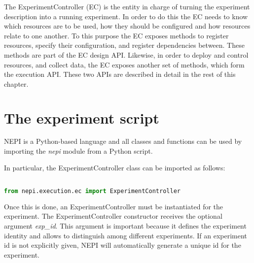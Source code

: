 %
%
%
%
%
%


The ExperimentController (EC) is the entity in charge of turning the 
experiment description into a running experiment. 
In order to do this the EC needs to know which resources are to be 
used, how they should be configured and how resources relate to one another.
To this purpose the EC exposes methods to register resources, specify their 
configuration, and register dependencies between. These methods are part of
the EC design API.
Likewise, in order to deploy and control resources, and collect data, 
the EC exposes another set of methods, which form the execution API. 
These two APIs are described in detail in the rest of this chapter.


\section{The experiment script}

NEPI is a Python-based language and all classes and functions can
be used by importing the \emph{nepi} module from a Python script.

In particular, the ExperimentController class can be imported as follows:

\begin{lstlisting}[language=Python]

from nepi.execution.ec import ExperimentController

\end{lstlisting}

Once this is done, an ExperimentController must be instantiated for
the experiment. The ExperimentController constructor receives
the optional argument \emph{exp\_id}. This argument is important because
it defines the experiment identity and allows to distinguish among different
experiments. If an experiment id is not explicitly given, NEPI will automatically
generate a unique id for the experiment. 

